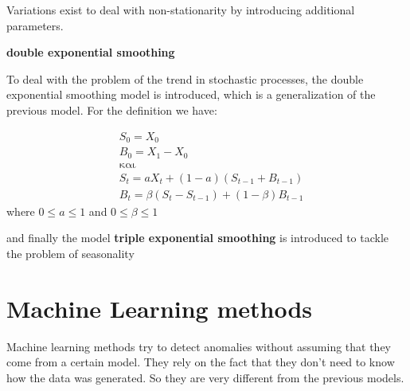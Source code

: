 \documentclass[a4paper,12pt]{report}
\theoremstyle{definitionNODot}
\begin{document}
\begin{itemize}
		Variations exist to deal with non-stationarity by introducing additional parameters.
		
		\textbf{double exponential smoothing} 
		
		To deal with the problem of the trend in stochastic processes, the double exponential smoothing model is introduced, which is a generalization of the previous model. For the definition we have:
		
		\begin{align*}
			& S_0=X_0 \\
			& B_0=X_1-X_0 \\ 
			& \text{και} \\
			& S_t = aX_t + (1-a)(S_{t-1}+B_{t-1}) \\
			& B_t = \beta(S_t-S_{t-1}) + (1-\beta)B_{t-1}
		\end{align*}
		where $0\leq a\leq 1$ and $0\leq \beta\leq 1$
		
		and finally the model \textbf{triple exponential smoothing} is introduced to tackle the problem of seasonality \cite{HYNDMAN2002439}			
	\end{itemize}
	
	\section{Machine Learning methods}
	Machine learning methods try to detect anomalies without assuming that they come from a certain model. They rely on the fact that they don't need to know how the data was generated. So they are very different from the previous models.
	
\end{document}

